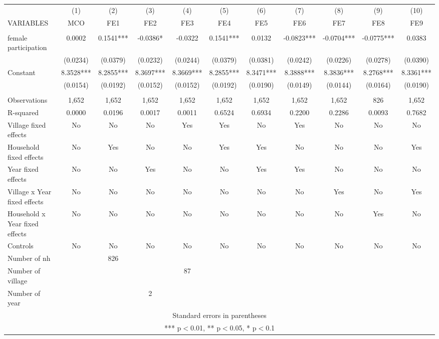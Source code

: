 \documentclass[]{article}
\begin{document}
\begin{tabular}{lcccccccccc} \hline
 & (1) & (2) & (3) & (4) & (5) & (6) & (7) & (8) & (9) & (10) \\
VARIABLES & MCO & FE1 & FE2 & FE3 & FE4 & FE5 & FE6 & FE7 & FE8 & FE9 \\ \hline
 &  &  &  &  &  &  &  &  &  &  \\
female participation & 0.0002 & 0.1541*** & -0.0386* & -0.0322 & 0.1541*** & 0.0132 & -0.0823*** & -0.0704*** & -0.0775*** & 0.0383 \\
 & (0.0234) & (0.0379) & (0.0232) & (0.0244) & (0.0379) & (0.0381) & (0.0242) & (0.0226) & (0.0278) & (0.0390) \\
Constant & 8.3528*** & 8.2855*** & 8.3697*** & 8.3669*** & 8.2855*** & 8.3471*** & 8.3888*** & 8.3836*** & 8.2768*** & 8.3361*** \\
 & (0.0154) & (0.0192) & (0.0152) & (0.0152) & (0.0192) & (0.0190) & (0.0149) & (0.0144) & (0.0164) & (0.0190) \\
 &  &  &  &  &  &  &  &  &  &  \\
Observations & 1,652 & 1,652 & 1,652 & 1,652 & 1,652 & 1,652 & 1,652 & 1,652 & 826 & 1,652 \\
R-squared & 0.0000 & 0.0196 & 0.0017 & 0.0011 & 0.6524 & 0.6934 & 0.2200 & 0.2286 & 0.0093 & 0.7682 \\
Village fixed effects & No & No & No & Yes & Yes & No & Yes & No & No & No \\
Household fixed effects & No & Yes & No & No & Yes & Yes & No & No & No & Yes \\
Year fixed effects & No & No & Yes & No & No & Yes & Yes & No & No & No \\
Village x Year fixed effects & No & No & No & No & No & No & No & Yes & No & Yes \\
Household x Year fixed effects & No & No & No & No & No & No & No & No & Yes & No \\
Controls & No & No & No & No & No & No & No & No & No & No \\
Number of nh &  & 826 &  &  &  &  &  &  &  &  \\
Number of village &  &  &  & 87 &  &  &  &  &  &  \\
 Number of year &  &  & 2 &  &  &  &  &  &  &  \\ \hline
\multicolumn{11}{c}{ Standard errors in parentheses} \\
\multicolumn{11}{c}{ *** p$<$0.01, ** p$<$0.05, * p$<$0.1} \\
\end{tabular}
\end{document}
